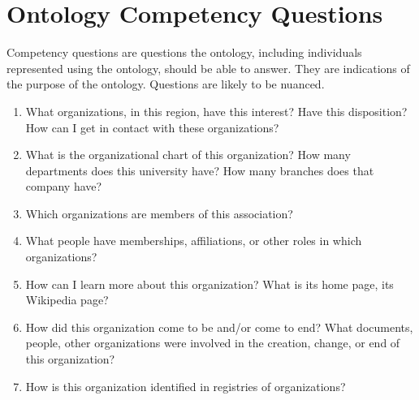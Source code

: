 \documentclass[letterpaper,10pt,english]{sphinxmanual}
\begin{document}
\section{Ontology Competency Questions \sphinxfootnotemark[1]}
\label{\detokenize{domain-definition:ontology-competency-questions-1}}\label{\detokenize{domain-definition:index-1}}%
\begin{footnotetext}[1]\label{\thesphinxscope.1}%
\sphinxAtStartFootnote
Competency questions are questions the ontology, including individuals
represented using the ontology, should be able to answer. They are indications of
the purpose of the ontology. Questions are likely to be nuanced.
%
\end{footnotetext}\ignorespaces \begin{enumerate}
%
\item {} 
\sphinxAtStartPar
What organizations, in this region, have this interest?  Have this disposition? How
can I
get in contact with these organizations?

\item {} 
\sphinxAtStartPar
What is the organizational chart of this organization?  How many departments does
this university have?  How many branches does that company have?

\item {} 
\sphinxAtStartPar
Which organizations are members of this association?

\item {} 
\sphinxAtStartPar
What people have memberships, affiliations, or other roles in which organizations?

\item {} 
\sphinxAtStartPar
How can I learn more about this organization?  What is its home page, its Wikipedia
page?

\item {} 
\sphinxAtStartPar
How did this organization come to be and/or come to end?  What documents, people,
other organizations were involved in the creation, change, or end of this
organization?

\item {} 
\sphinxAtStartPar
How is this organization identified in registries of organizations?

\end{enumerate}
\end{document}

